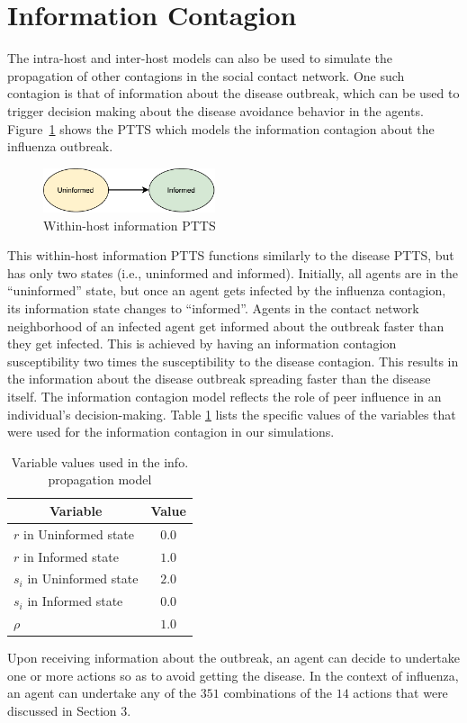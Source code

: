 \documentclass[doublespace,draft]{VTthesis}
\begin{document}
    \section{Information Contagion}
    The intra-host and inter-host models can also be used to simulate the propagation of other contagions in the social contact network. One such contagion is that of information about the disease outbreak, which can be used to trigger decision making about the disease avoidance behavior in the agents. Figure~\ref{fig:information} shows the PTTS which models the information contagion about the influenza outbreak. 
    \begin{figure}
    \centering
    \includegraphics[width=0.45\textwidth]{figures/information-fsm.pdf}
    \caption{Within-host information PTTS}
    \label{fig:information}
    \end{figure}
    This within-host information PTTS functions similarly to the disease PTTS, but has only two states (i.e., uninformed and informed). Initially, all agents are in the ``uninformed'' state, but once an agent gets infected by the influenza contagion, its information state changes to ``informed''. Agents in the contact network neighborhood of an infected agent get informed about the outbreak faster than they get infected. This is achieved by having an information contagion susceptibility two times the susceptibility to the disease contagion. This results in the information about the disease outbreak spreading faster than the disease itself. The information contagion model reflects the role of peer influence in an individual's decision-making. Table \ref{table:2} lists the specific values of the variables that were used for the information contagion in our simulations.
    \begin{table}[!t]
    \renewcommand{\arraystretch}{1.2}
    \caption{Variable values used in the info. propagation model}
    \centering
    \begin{tabular}{|l|c|}
    \hline
    \multicolumn{1}{|c|}{\textbf{Variable}} & \textbf{Value}  \\ \hline
    $r$ in Uninformed state & $0.0$ \\ \hline
    $r$ in Informed state & $1.0$ \\ \hline
    $s_i$ in Uninformed state & $2.0$ \\ \hline
    $s_i$ in Informed state & $0.0$ \\ \hline 
    $\rho$ & $1.0$ \\ \hline
    \end{tabular}
    \label{table:2}
    \end{table}
    Upon receiving information about the outbreak, an agent can decide to undertake one or more actions so as to avoid getting the disease. In the context of influenza, an agent can undertake any of the $351$ combinations of the $14$ actions that were discussed in Section 3. 
    
\end{document}
